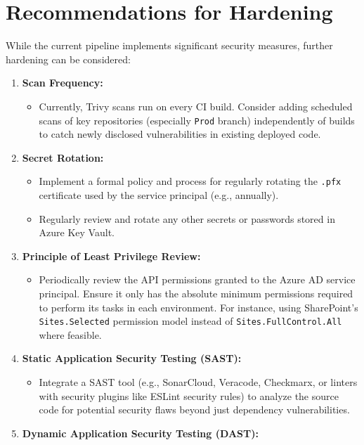 \section{Recommendations for Hardening}
\label{sec:RecommendationsHardening}

While the current pipeline implements significant security measures, further hardening can be considered:

\begin{enumerate}
    \item \textbf{Scan Frequency:}
    \begin{itemize}
        \item Currently, Trivy scans run on every CI build. Consider adding scheduled scans of key repositories (especially \texttt{Prod} branch) independently of builds to catch newly disclosed vulnerabilities in existing deployed code.
    \end{itemize}
    \item \textbf{Secret Rotation:}
    \begin{itemize}
        \item Implement a formal policy and process for regularly rotating the \texttt{.pfx} certificate used by the service principal (e.g., annually).
        \item Regularly review and rotate any other secrets or passwords stored in Azure Key Vault.
    \end{itemize}
    \item \textbf{Principle of Least Privilege Review:}
    \begin{itemize}
        \item Periodically review the API permissions granted to the Azure AD service principal. Ensure it only has the absolute minimum permissions required to perform its tasks in each environment. For instance, using SharePoint's \texttt{Sites.Selected} permission model instead of \texttt{Sites.FullControl.All} where feasible.
    \end{itemize}
    \item \textbf{Static Application Security Testing (SAST):}
    \begin{itemize}
        \item Integrate a SAST tool (e.g., SonarCloud, Veracode, Checkmarx, or linters with security plugins like ESLint security rules) to analyze the source code for potential security flaws beyond just dependency vulnerabilities.
    \end{itemize}
    \item \textbf{Dynamic Application Security Testing (DAST):}

\end{enumerate}
